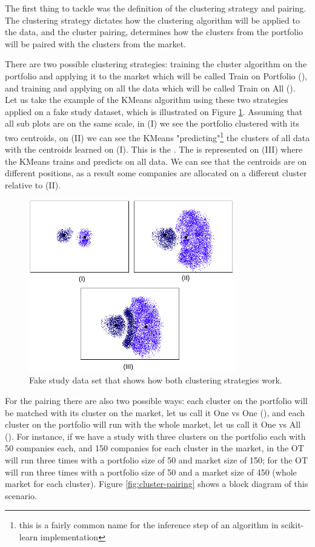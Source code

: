 The first thing to tackle was the definition of the clustering strategy and pairing. The clustering strategy dictates how the clustering algorithm will be applied to the data, and the cluster pairing, determines how the clusters from the portfolio will be paired with the clusters from the market.

There are two possible clustering strategies: training the cluster algorithm on the portfolio and applying it to the market which will be called Train on Portfolio (\nameClusterStrategyA{}), and training and applying on all the data which will be called Train on All (\nameClusterStrategyB{}). Let us take the example of the KMeans algorithm using these two strategies applied on a fake study dataset, which is illustrated on Figure \ref{fig:cluster-strategy}. Assuming that all sub plots are on the same scale, in (I) we see the portfolio clustered with its two centroids, on (II) we can see the KMeans "predicting"\footnote{this is a fairly common name for the inference step of an algorithm in scikit-learn implementation} the clusters of all data with the centroids learned on (I). This is the \nameClusterStrategyA{}. The \nameClusterStrategyB{} is represented on (III) where the KMeans trains and predicts on all data. We can see that the centroids are on different positions, as a result some companies are allocated on a different cluster relative to (II). 

\begin{figure}[h]
   \centering
   \includegraphics[width=9cm]{fig/ch3-cluster-strategy.png}
   \caption{Fake study data set that shows how both clustering strategies work.}
   \label{fig:cluster-strategy}
\end{figure}

For the pairing there are also two possible ways: each cluster on the portfolio will be matched with its cluster on the market, let us call it One vs One (\nameClusterPairingA{}), and each cluster on the portfolio will run with the whole market, let us call it One vs All (\nameClusterPairingB{}). For instance, if we have a study with three clusters on the portfolio each with 50 companies each, and 150 companies for each cluster in the market, in \nameClusterPairingA{} the OT will run three times with a portfolio size of 50 and market size of 150; for \nameClusterPairingB{} the OT will run three times with a portfolio size of 50 and a market size of 450 (whole market for each cluster). Figure \ref{fig:cluster-pairing} shows a block diagram of this scenario.

